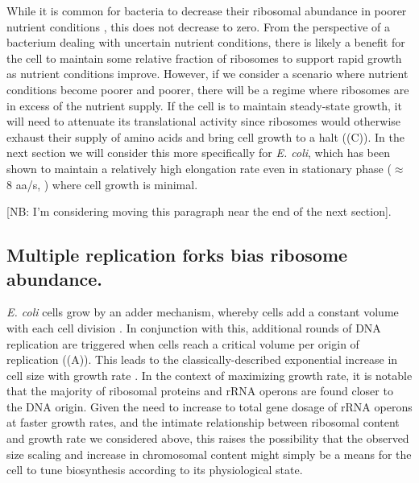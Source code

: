 While it is common for bacteria to decrease their ribosomal abundance in poorer
nutrient conditions \cite{scott2010, liebermeister2014}, this does not decrease
to zero. From the perspective of a bacterium dealing with uncertain nutrient
conditions, there is likely a benefit for the cell to maintain some relative
fraction of ribosomes to support rapid growth as nutrient conditions improve.
However, if we consider a scenario where nutrient conditions become poorer and
poorer, there will be a regime where ribosomes are in excess of the nutrient
supply. If the cell is to maintain steady-state growth, it will need to
attenuate its translational activity since ribosomes would otherwise exhaust
their supply of amino acids and bring cell growth to a halt
((C)). In the next section we will consider this more
specifically for \textit{E. coli}, which has been shown to maintain a relatively
high elongation rate even in stationary phase ($\approx$ 8 aa/s, \cite{dai2016})
where cell growth is minimal.

[NB: I'm considering moving this paragraph near the end of the next section].


\subsection{Multiple replication forks bias ribosome abundance.}

\textit{E. coli} cells grow by an adder mechanism, whereby cells add a constant
volume with each cell division \citep{taheriaraghi2015}. In conjunction with
this, additional rounds of DNA replication are triggered when cells reach a
critical volume per origin of replication ((A)). This
leads to the classically-described exponential increase in cell size with growth
rate \cite{schaechter1958, si2017, si2019}. In the context of maximizing growth
rate, it is notable that the majority of ribosomal proteins and rRNA operons are
found closer to the DNA origin. Given the need to increase to total gene dosage
of rRNA operons at faster growth rates, and the intimate relationship between ribosomal
content and growth rate we considered above, this raises the possibility that the
observed size scaling and increase in chromosomal content might simply be
a means for the cell to tune biosynthesis according to its
physiological state.

